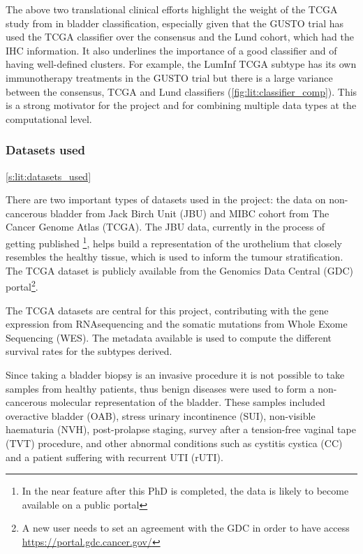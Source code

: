 The above two translational clinical efforts highlight the weight of the TCGA study from \citet{Robertson2017-mg} in bladder classification, especially given that the GUSTO trial has used the TCGA classifier over the consensus and the Lund cohort, which had the IHC information. It also underlines the importance of a good classifier and of having well-defined clusters. For example, the LumInf TCGA subtype has its own immunotherapy treatments in the GUSTO trial \citet{Griffin2024-zr} but there is a large variance between the consensus, TCGA and Lund classifiers (\cref{fig:lit:classifier_comp}). This is a strong motivator for the project and for combining multiple data types at the computational level.


\subsubsection{Datasets used} \cref{s:lit:datasets_used}

There are two important types of datasets used in the project: the data on non-cancerous bladder from Jack Birch Unit (JBU) and MIBC cohort from The Cancer Genome Atlas (TCGA). The JBU data, currently in the process of getting published \footnote{In the near feature after this PhD is completed, the data is likely to become available on a public portal}, helps build a representation of the urothelium that closely resembles the healthy tissue, which is used to inform the tumour stratification. The TCGA dataset is publicly available from the Genomics Data Central (GDC) portal\footnote{A new user needs to set an agreement with the GDC in order to have access \url{https://portal.gdc.cancer.gov/}}.

The TCGA datasets are central for this project, contributing with the gene expression from RNAsequencing and the somatic mutations from Whole Exome Sequencing (WES). The metadata available is used to compute the different survival rates for the subtypes derived. 

Since taking a bladder biopsy is an invasive procedure it is not possible to take samples from healthy patients, thus benign diseases were used to form a non-cancerous molecular representation of the bladder. These samples included overactive bladder (OAB), stress urinary incontinence (SUI), non-visible haematuria (NVH), post-prolapse staging, survey after a tension-free vaginal tape (TVT) procedure, and other abnormal conditions such as cystitis cystica (CC) and a patient suffering with recurrent UTI (rUTI).

